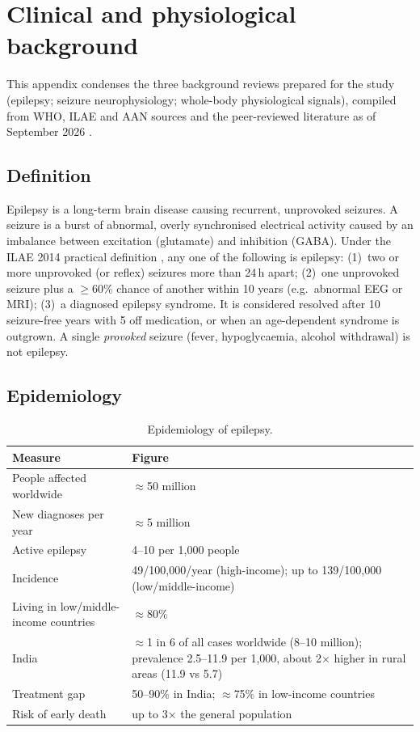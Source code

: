 \section{Clinical and physiological background}
\label{app:background}

This appendix condenses the three background reviews prepared for the study (epilepsy; seizure neurophysiology; whole-body physiological signals), compiled from WHO, ILAE and AAN sources and the peer-reviewed literature as of September 2026 \cite{who,ilae2014,ilae2025,kwan2000,sudep}.

\subsection{Definition}

Epilepsy is a long-term brain disease causing recurrent, unprovoked seizures. A seizure is a burst of abnormal, overly synchronised electrical activity caused by an imbalance between excitation (glutamate) and inhibition (GABA). Under the ILAE 2014 practical definition \cite{ilae2014}, any one of the following is epilepsy: (1)~two or more unprovoked (or reflex) seizures more than 24\,h apart; (2)~one unprovoked seizure plus a $\ge$60\% chance of another within 10 years (e.g.\ abnormal EEG or MRI); (3)~a diagnosed epilepsy syndrome. It is considered resolved after 10 seizure-free years with 5 off medication, or when an age-dependent syndrome is outgrown. A single \emph{provoked} seizure (fever, hypoglycaemia, alcohol withdrawal) is not epilepsy.

\subsection{Epidemiology}

\begin{table}[H]
\centering\small
\caption{Epidemiology of epilepsy.}
\begin{tabularx}{\linewidth}{@{}l L@{}}
\toprule
Measure & Figure \\
\midrule
People affected worldwide & $\approx$50 million \\
New diagnoses per year & $\approx$5 million \\
Active epilepsy & 4--10 per 1,000 people \\
Incidence & 49/100,000/year (high-income); up to 139/100,000 (low/middle-income) \\
Living in low/middle-income countries & $\approx$80\% \\
India & $\approx$1 in 6 of all cases worldwide (8--10 million); prevalence 2.5--11.9 per 1,000, about 2$\times$ higher in rural areas (11.9 vs 5.7) \\
Treatment gap & 50--90\% in India; $\approx$75\% in low-income countries \\
Risk of early death & up to 3$\times$ the general population \\
\bottomrule
\end{tabularx}
\end{table}

